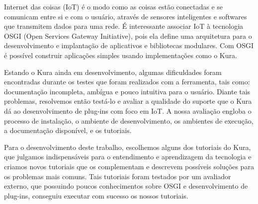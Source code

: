Internet das coisas (IoT) é o modo como as coisas estão conectadas e se comunicam entre si e com o usuário, através de sensores inteligentes e softwares que transmitem dados para uma rede. É interessante associar IoT à tecnologia OSGI (Open Services Gateway Initiative), pois ela define uma arquitetura para o desenvolvimento e implantação de aplicativos e bibliotecas modulares. Com OSGI é possível construir aplicações simples usando implementações como o Kura.

\setlength{\parindent}{5ex} Estando o Kura ainda em desenvolvimento, algumas dificuldades foram encontradas durante os testes que foram realizados com a ferramenta, tais como: documentação incompleta, ambígua e pouco intuitiva para o usuário. Diante tais problemas, resolvemos então testá-lo e avaliar a qualidade do suporte que o Kura dá ao desenvolvimento de plug-ins com foco em IoT. A nossa avaliação engloba o processo de instalação, o ambiente de desenvolvimento, os ambientes de execução, a documentação disponível, e os tutoriais. \par

Para o desenvolvimento deste trabalho, escolhemos alguns dos tutoriais do Kura, que julgamos indispensáveis para o entendimento e aprendizagem da tecnologia e criamos novos tutoriais que os complementam e descrevem possíveis soluções para os problemas mais comuns. Tais tutoriais foram testados por um avaliador externo, que possuindo poucos conhecimentos sobre OSGI e desenvolvimento de plug-ins, conseguiu executar com sucesso os nossos tutoriais. 